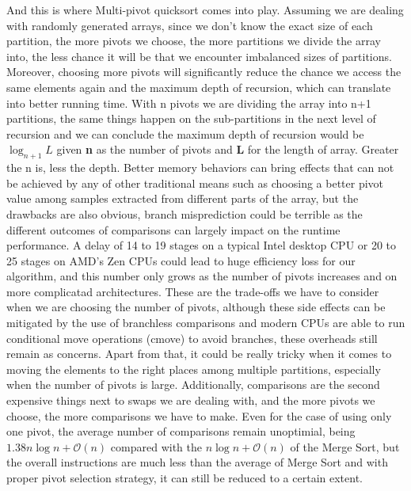 \documentclass{article}
\newcommand{\bigO}{\mathcal{O}}
\begin{document}
And this is where Multi-pivot quicksort comes into play. Assuming we are dealing with randomly generated arrays,
since we don't know the exact size of each partition, the more pivots we choose, the more partitions we divide the array into,
the less chance it will be that we encounter imbalanced sizes of partitions. 
Moreover, choosing more pivots will significantly reduce the chance we access the same elements again and the maximum depth of recursion,
which can translate into better running time. With n pivots we are dividing the array into n+1 partitions, the same things happen on the sub-partitions 
in the next level of recursion and we can conclude the maximum depth of recursion would be $\log_{n+1} L$ given \textbf{n} as the number of pivots and \textbf{L} for the length of array.
Greater the n is, less the depth. Better memory behaviors can bring effects that can not be achieved by any of other traditional means such as choosing a better pivot value
among samples extracted from different parts of the array, but the drawbacks are also obvious, 
branch misprediction could be terrible as the different outcomes of comparisons can largely impact on the runtime performance.
A delay of 14 to 19 stages on a typical Intel desktop CPU or 20 to 25 stages on AMD's Zen CPUs could lead to huge efficiency loss for our algorithm,
and this number only grows as the number of pivots increases and on more complicatad architectures. These are the trade-offs we have to consider when we are choosing the number of pivots,
although these side effects can be mitigated by the use of branchless comparisons and modern CPUs are able to run conditional move operations (cmove) to avoid branches,
these overheads still remain as concerns.
Apart from that, it could be really tricky when it comes to moving the elements to the right places among multiple partitions, especially when the number of pivots is large.
Additionally, comparisons are the second expensive things next to swaps we are dealing with, and the more pivots we choose, the more comparisons we have to make.
Even for the case of using only one pivot, the average number of comparisons remain unoptimial, being $1.38n\log n + \bigO(n)$ compared with the $n\log n + \bigO(n)$ of the Merge Sort,
but the overall instructions are much less than the average of Merge Sort and with proper pivot selection strategy, it can still be reduced to a certain extent.

\end{document}
